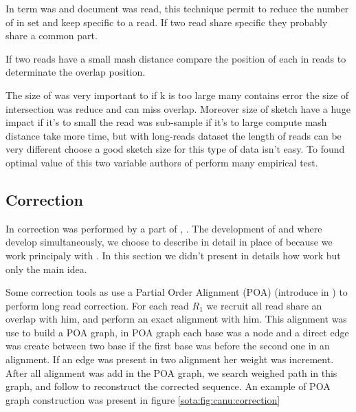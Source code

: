 \documentclass[main]{subfiles}
\begin{document}
In \mhap term was \kmer and document was read, this technique permit to reduce the number of \kmer in set and keep \kmer specific to a read. If two read share specific \kmer they probably share a common part.

If two reads have a small mash distance \mhap compare the position of each \kmer in reads to determinate the overlap position.

The size of \kmer was very important to if k is too large many \kmer contains error the size of intersection was reduce and \mhap can miss overlap. Moreover size of sketch have a huge impact if it's to small the read was sub-sample if it's to large compute mash distance take more time, but with long-reads dataset the length of reads can be very different choose a good sketch size for this type of data isn't easy. To found optimal value of this two variable authors of \mhap perform many empirical test.

\subsection{Correction}

In \canu correction was performed by a part of  \cite{falcon}, . The development of  and \canu where develop simultaneously, we choose to describe \canu in detail in place of  because we work principaly with \canu. In this section we didn't present in details how  work but only the main idea.

Some correction tools as  use a Partial Order Alignment (POA) (introduce in \cite{poa}) to perform long read correction. For each read \texttt{$R_1$} we recruit all read share an overlap with him, and perform an exact alignment with him. This alignment was use to build a POA graph, in POA graph each base was a node and a direct edge was create between two base if the first base was before the second one in an alignment. If an edge was present in two alignment her weight was increment. After all alignment was add in the POA graph, we search weighed path in this graph, and follow to reconstruct the corrected sequence. An example of POA graph construction was present in figure \ref{sota:fig:canu:correction}
\end{document}
